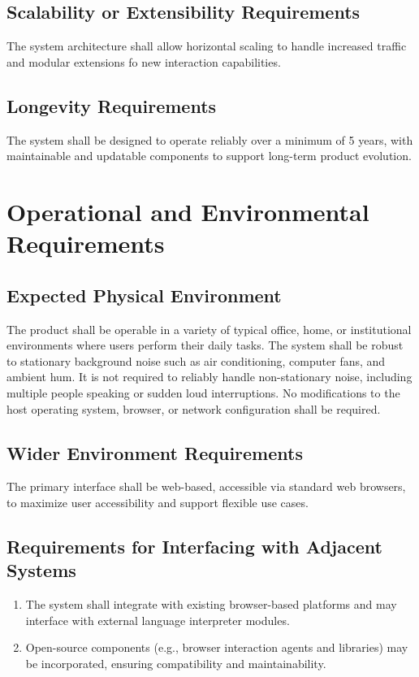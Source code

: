 \documentclass[12pt]{article}
\begin{document}
\subsection{Scalability or Extensibility Requirements}
The system architecture shall allow horizontal scaling to handle increased traffic and modular extensions fo new interaction capabilities. 
\subsection{Longevity Requirements}
The system shall be designed to operate reliably over a minimum of 5 years, with maintainable and updatable components to support long-term product evolution.

\section{Operational and Environmental Requirements}
\subsection{Expected Physical Environment}
The product shall be operable in a variety of typical office, home, or institutional environments where users perform their daily tasks. The system shall be robust to stationary background noise such as air conditioning, computer fans, and ambient hum. It is not required to reliably handle non-stationary noise, including multiple people speaking or sudden loud interruptions. No modifications to the host operating system, browser, or network configuration shall be required.
\subsection{Wider Environment Requirements}
The primary interface shall be web-based, accessible via standard web browsers, to maximize user accessibility and support flexible use cases.
\subsection{Requirements for Interfacing with Adjacent Systems}
\begin{enumerate}
    \item The system shall integrate with existing browser-based platforms and may interface with external language interpreter modules.
    \item Open-source components (e.g., browser interaction agents and libraries) may be incorporated, ensuring compatibility and maintainability.
\end{enumerate}
\end{document}
